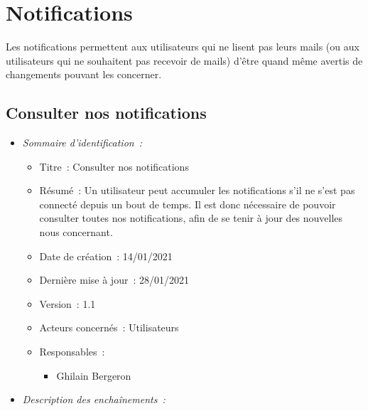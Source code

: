 \section{Notifications}\label{sec:fonctionnalites-notifications}

Les notifications permettent aux utilisateurs qui ne lisent pas leurs mails (ou aux utilisateurs qui ne souhaitent pas recevoir de mails) d'être quand même avertis de changements pouvant les concerner.

\subsection{Consulter nos notifications}\label{subsec:consulter-nos-notifications}

\begin{itemize}

\item \textit{Sommaire d'identification~:}

    \begin{itemize}
    
    \item Titre~: Consulter nos notifications
    
    \item Résumé~: Un utilisateur peut accumuler les notifications s'il ne s'est pas connecté depuis un bout de temps.
    Il est donc nécessaire de pouvoir consulter toutes nos notifications, afin de se tenir à jour des nouvelles nous concernant.
    
    \item Date de création~: 14/01/2021
    
    \item Dernière mise à jour~: 28/01/2021
    
    \item Version~: 1.1
    
    \item Acteurs concernés~: Utilisateurs
    
    \item Responsables~:

        \begin{itemize}
            \item Ghilain Bergeron
        \end{itemize}
    
    \end{itemize}

\item \textit{Description des enchaînements~:}


\end{itemize}

